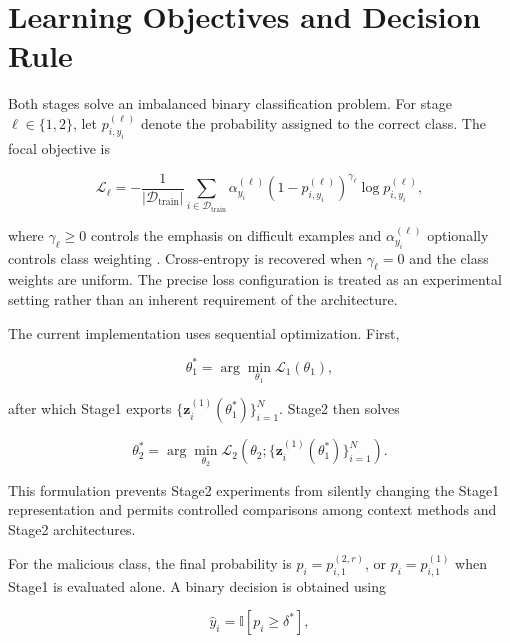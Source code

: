 \documentclass[11pt,fleqn]{report}
\begin{document}
\section{Learning Objectives and Decision Rule}
\label{subsec:learning_objectives}

Both stages solve an imbalanced binary classification problem. For stage
$\ell\in\{1,2\}$, let $p^{(\ell)}_{i,y_i}$ denote the probability assigned to
the correct class. The focal objective is

\begin{equation}
\mathcal{L}_{\ell}
=
-\frac{1}{|\mathcal{D}_{\mathrm{train}}|}
\sum_{i\in\mathcal{D}_{\mathrm{train}}}
\alpha^{(\ell)}_{y_i}
\left(
    1-p^{(\ell)}_{i,y_i}
\right)^{\gamma_{\ell}}
\log p^{(\ell)}_{i,y_i},
\label{eq:focal_objective}
\end{equation}

where $\gamma_{\ell}\geq0$ controls the emphasis on difficult examples and
$\alpha^{(\ell)}_{y_i}$ optionally controls class weighting
\cite{Lin2017FocalLoss}. Cross-entropy is recovered when
$\gamma_{\ell}=0$ and the class weights are uniform. The precise loss
configuration is treated as an experimental setting rather than an inherent
requirement of the architecture.

The current implementation uses sequential optimization. First,

\begin{equation}
\theta_1^{*}
=
\arg\min_{\theta_1}
\mathcal{L}_{1}(\theta_1),
\end{equation}

after which Stage1 exports
$\{\mathbf{z}^{(1)}_i(\theta_1^{*})\}_{i=1}^{N}$. Stage2 then solves

\begin{equation}
\theta_2^{*}
=
\arg\min_{\theta_2}
\mathcal{L}_{2}
\left(
    \theta_2;
    \{\mathbf{z}^{(1)}_i(\theta_1^{*})\}_{i=1}^{N}
\right).
\end{equation}

This formulation prevents Stage2 experiments from silently changing the
Stage1 representation and permits controlled comparisons among context methods
and Stage2 architectures.

For the malicious class, the final probability is
$p_i=p^{(2,r)}_{i,1}$, or $p_i=p^{(1)}_{i,1}$ when Stage1 is evaluated alone. A
binary decision is obtained using

\begin{equation}
\widehat{y}_i
=
\mathbb{I}[p_i\geq\delta^{*}],
\end{equation}
\end{document}
